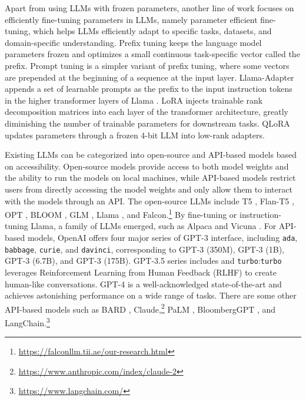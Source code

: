 \documentclass[11pt]{article}
\begin{document}
Apart from using LLMs with frozen parameters, another line of work focuses on efficiently fine-tuning parameters in LLMs, namely parameter efficient fine-tuning, which helps LLMs efficiently adapt to specific tasks, datasets, and domain-specific understanding. Prefix tuning \cite{li2021prefix} keeps the language model parameters frozen and optimizes a small continuous task-specific vector called the prefix. Prompt tuning \cite{lester2021power} is a simpler variant of prefix tuning, where some vectors are prepended at the beginning of a sequence at the input layer. Llama-Adapter \cite{zhang2023llamaadapter} appends a set of learnable prompts as the prefix to the input instruction tokens in the higher transformer layers of Llama \cite{touvron2023llama}.
LoRA \cite{hu2021lora} injects trainable rank decomposition matrices into each layer of the transformer architecture, greatly diminishing the number of trainable parameters for downstream tasks. QLoRA \cite{dettmers2023qlora} updates parameters through a frozen 4-bit LLM into low-rank adapters. 



Existing LLMs can be categorized into open-source and API-based models based on accessibility. Open-source models provide access to both model weights and the ability to run the models on local machines, while API-based models restrict users from directly accessing the model weights and only allow them to interact with the models through an API. The open-source LLMs include T5 \cite{raffel2020t5}, Flan-T5 \cite{chung2022scaling}, OPT \cite{zhang2022opt}, BLOOM \cite{scao2022bloom}, GLM \cite{zeng2022glm}, Llama \cite{touvron2023llama}, and Falcon.\footnote{\url{https://falconllm.tii.ae/our-research.html}} By fine-tuning or instruction-tuning Llama, a family of LLMs emerged, such as Alpaca \cite{taori2023alpaca} and Vicuna \cite{chiang2023vicuna}. For API-based models, OpenAI offers four major series of GPT-3 \cite{brown2020language} interface, including \texttt{ada}, \texttt{babbage}, \texttt{curie}, and \texttt{davinci}, corresponding to GPT-3 (350M), GPT-3 (1B), GPT-3 (6.7B), and GPT-3 (175B). GPT-3.5 series includes  and \texttt{turbo}:\texttt{turbo} leverages Reinforcement Learning from Human Feedback (RLHF) \cite{ouyang2022training} to create human-like conversations. GPT-4 \cite{openai2023gpt4} is a well-acknowledged state-of-the-art and achieves astonishing performance on a wide range of tasks. There are some other API-based models such as BARD \cite{manyika2023overview}, Claude,\footnote{\url{https://www.anthropic.com/index/claude-2}} PaLM \cite{chowdhery2022palm}, BloombergGPT \cite{wu2023bloomberggpt}, and LangChain.\footnote{\url{https://www.langchain.com/}}
\end{document}
